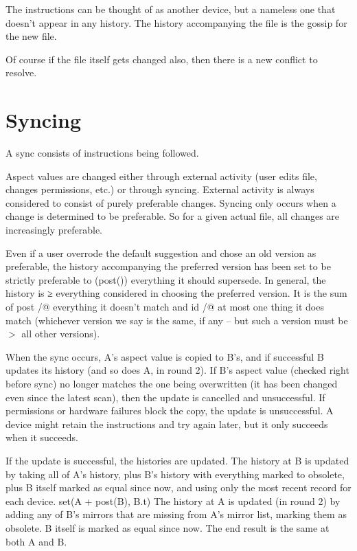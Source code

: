 \documentclass{book}
\begin{document}
The instructions can be thought of as another device, but a nameless one that doesn't appear in any history.  The history accompanying the file is the gossip for the new file.

Of course if the file itself gets changed also, then there is a new conflict to resolve.


\section{Syncing}

A sync consists of instructions being followed.

Aspect values are changed either through external activity (user edits file, changes permissions, etc.) or through syncing.
External activity is always considered to consist of purely preferable changes.
Syncing only occurs when a change is determined to be preferable.
So for a given actual file, all changes are increasingly preferable.

Even if a user overrode the default suggestion and chose an old version as preferable, the history accompanying the preferred version has been set to be strictly preferable to (post()) everything it should supersede.  In general, the history is ≥ everything considered in choosing the preferred version.  It is the sum of post /@ everything it doesn't match and id /@ at most one thing it does match (whichever version we say is the same, if any -- but such a version must be $>$ all other versions).

When the sync occurs, A's aspect value is copied to B's, and if successful B updates its history (and so does A, in round 2).
If B's aspect value (checked right before sync) no longer matches the one being overwritten (it has been changed even since the latest scan), then the update is cancelled and unsuccessful.
If permissions or hardware failures block the copy, the update is unsuccessful.
A device might retain the instructions and try again later, but it only succeeds when it succeeds.

If the update is successful, the histories are updated.
The history at B is updated by taking all of A's history, plus B's history with everything marked to obsolete, plus B itself marked as equal since now, and using only the most recent record for each device.  set(A + post(B), B.t)
The history at A is updated (in round 2) by adding any of B's mirrors that are missing from A's mirror list, marking them as obsolete.  B itself is marked as equal since now.
The end result is the same at both A and B.
\end{document}
